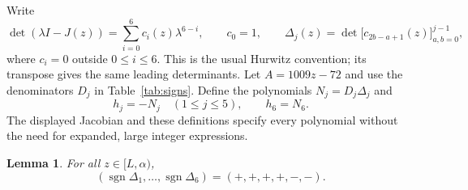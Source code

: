 \documentclass[11pt]{article}
\newtheorem{lemma}{Lemma}
\newcommand{\dd}{\Delta}
\begin{document}
Write
\[
 \det(\lambda I-J(z))=\sum_{i=0}^{6}c_i(z)\lambda^{6-i},\qquad c_0=1,
 \qquad
 \dd_j(z)=\det\big[c_{2b-a+1}(z)\big]_{a,b=0}^{j-1},
\]
where $c_i=0$ outside $0\le i\le6$. This is the usual Hurwitz convention;
its transpose gives the same leading determinants.
Let $A=1009z-72$ and use the denominators $D_j$ in Table~\ref{tab:signs}.
Define the polynomials $N_j=D_j\dd_j$ and
\[
 h_j=-N_j\quad(1\le j\le5),\qquad h_6=N_6.
\]
The displayed Jacobian and these definitions specify every polynomial without
the need for expanded, large integer expressions.

\begin{lemma}\label{lem:sign}
For all $z\in[L,\alpha)$,
\[
 (\operatorname{sgn}\dd_1,\ldots,\operatorname{sgn}\dd_6)
       =(+,+,+,+,-,-).
\]
\end{lemma}
\end{document}
